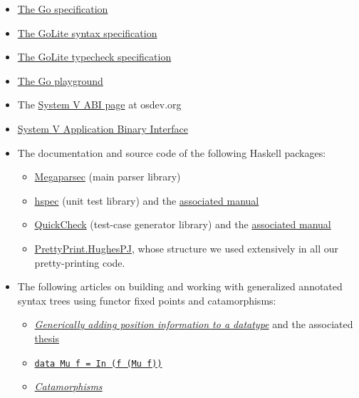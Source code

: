 \documentclass[letterpaper,11pt]{article}
\begin{document}
\begin{itemize}
\item \href{https://golang.org/ref/spec}{The Go specification}
\item \href{http://www.sable.mcgill.ca/~hendren/520/2016/assignments/syntax.pdf}{The GoLite syntax specification}
\item \href {http://www.sable.mcgill.ca/~hendren/520/2016/assignments/typechecker.pdf}{The GoLite typecheck specification}
\item \href{https://play.golang.org/}{The Go playground}
\item The \href{http://wiki.osdev.org/System_V_ABI}{System V ABI page} at osdev.org
\item \href{http://www.x86-64.org/documentation/abi.pdf}{System V Application Binary Interface}
\item The documentation and source code of the following Haskell packages:
	\begin{itemize}
	\item \href{https://hackage.haskell.org/package/megaparsec-4.3.0}{Megaparsec} (main parser library)
	\item \href{https://hackage.haskell.org/package/hspec}{hspec} (unit test library) and the \href{http://hspec.github.io/}{associated manual}
	\item \href{https://hackage.haskell.org/package/QuickCheck-2.8.2}{QuickCheck} (test-case generator library) and the \href{http://www.cse.chalmers.se/~rjmh/QuickCheck/manual.html}{associated manual}
	\item \href{http://hackage.haskell.org/package/pretty-1.1.2.0/docs/Text-PrettyPrint-HughesPJ.html}{PrettyPrint.HughesPJ}, whose structure we used extensively in all our pretty-printing code.
	\end{itemize}
\item The following articles on building and working with generalized annotated syntax trees using functor fixed points and catamorphisms:
	\begin{itemize}
	\item \href{http://martijn.van.steenbergen.nl/journal/2010/06/24/generically-adding-position-information-to-a-datatype/}{\textit{Generically adding position information to a datatype}} and the associated \href{http://martijn.van.steenbergen.nl/projects/Selections.pdf}{thesis}
	\item \href{http://blog.plover.com/prog/springschool95-2.html}{\texttt{data Mu f = In (f (Mu f))}}
	\item \href{https://www.schoolofhaskell.com/user/edwardk/recursion-schemes/catamorphisms}{\textit{Catamorphisms}}

\end{itemize}
\end{itemize}
\end{document}
